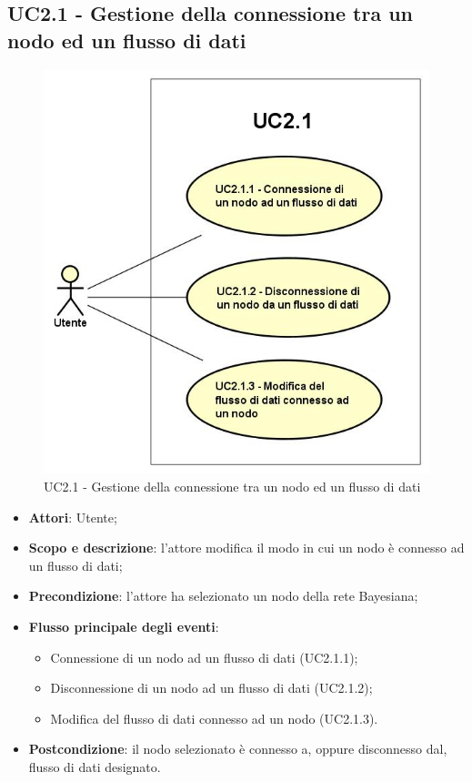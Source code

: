 \subsection{UC2.1 - Gestione della connessione tra un nodo ed un flusso di dati}
\hypertarget{UC2.1}{}
\begin{figure} [H]
	\centering
	\includegraphics[scale=0.45]{Img/UC2-1}
	\caption{UC2.1 - Gestione della connessione tra un nodo ed un flusso di dati}\label{}
\end{figure}
\begin{itemize}
	\item \textbf{Attori}: Utente;
	\item \textbf{Scopo e descrizione}: l'attore modifica il modo in cui un nodo è connesso ad un flusso di dati;
	\item \textbf{Precondizione}: l'attore ha selezionato un nodo della rete Bayesiana;
	\item \textbf{Flusso principale degli eventi}:
	\begin{itemize}
		\item Connessione di un nodo ad un flusso di dati (UC2.1.1);
		\item Disconnessione di un nodo ad un flusso di dati (UC2.1.2);
		\item Modifica del flusso di dati connesso ad un nodo (UC2.1.3).
	\end{itemize}
	\item \textbf{Postcondizione}: il nodo selezionato è connesso a, oppure disconnesso dal, flusso di dati designato.
\end{itemize}

